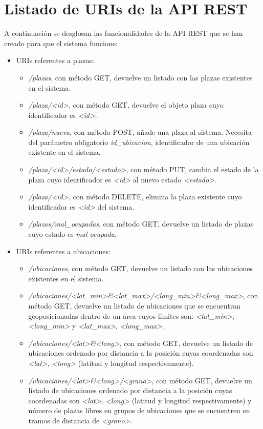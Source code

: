\chapter{Listado de URIs de la API REST}
A continuación se desglosan las funcionalidades de la API REST que se han creado para que el sistema funcione:
\begin{itemize}
	\item URIs referentes a plazas:
	\begin{itemize}
		\item \textit{/plazas}, con método GET, devuelve un listado con las plazas existentes en el sistema.
		\item \textit{/plaza/<id>}, con método GET, devuelve el objeto plaza cuyo identificador es \textit{<id>}.
		\item \textit{/plaza/nueva}, con método POST, añade una plaza al sistema. Necesita del parámetro obligatorio \textit{id\_ubicacion}, identificador de una ubicación existente en el sistema.
		\item \textit{/plaza/<id>/estado/<estado>}, con método PUT, cambia el estado de la plaza cuyo identificador es \textit{<id>} al nuevo estado \textit{<estado>}.
		\item \textit{/plaza/<id>}, con método DELETE, elimina la plaza existente cuyo identificador es \textit{<id>} del sistema.
		\item \textit{/plazas/mal\_ocupadas}, con método GET, devuelve un listado de plazas cuyo estado es \textit{mal ocupada}.
	\end{itemize}
	\item URIs referentes a ubicaciones:
	\begin{itemize}
			\item \textit{/ubicaciones}, con método GET, devuelve un listado con las ubicaciones existentes en el sistema.
		\item \textit{/ubicaciones/<lat\_min>\&<lat\_max>/<long\_min>\&<long\_max>}, con método GET, devuelve un listado de ubicaciones que se encuentran geoposicionadas dentro de un área cuyos límites son: \textit{<lat\_min>}, \textit{<long\_min>} y \textit{<lat\_max>}, \textit{<long\_max>}.
		\item \textit{/ubicaciones/<lat>\&<long>}, con método GET, devuelve un listado de ubicaciones ordenado por distancia a la posición cuyas coordenadas son \textit{<lat>}, \textit{<long>} (latitud y longitud respectivamente).
		\item \textit{/ubicaciones/<lat>\&<long>/<grano>}, con método GET, devuelve un listado de ubicaciones ordenado por distancia a la posición cuyas coordenadas son \textit{<lat>}, \textit{<long>} (latitud y longitud respectivamente) y número de plazas libres en grupos de ubicaciones que se encuentren en tramos de distancia de \textit{<grano>}.

\end{itemize}
\end{itemize}
